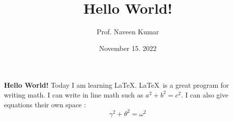 \documentclass{article}
\title{Hello World!}
\author{Prof. Naveen Kumar}
\date{November 15. 2022}
\begin{document}
\maketitle
\textbf{Hello World!} Today I am learning \LaTeX{}. \LaTeX\ is a great program for writing math. I can write in line math such as $a^2 + b^2 = c^2$. I can also give equations their own space : 
\[\gamma^2 + \theta^2 = \omega^2\]

\end{document}
